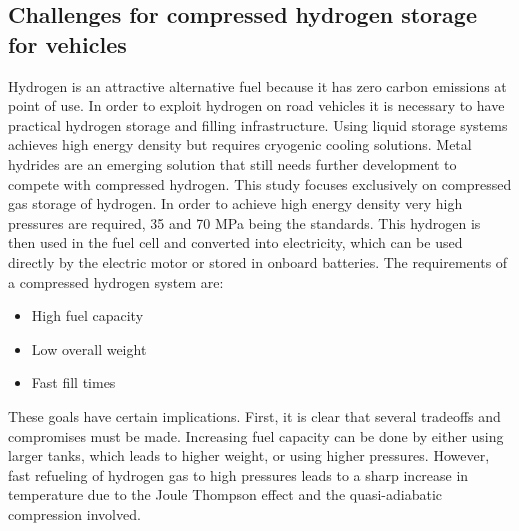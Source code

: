 


\subsection{Challenges for compressed hydrogen storage for vehicles}

\label{sec:challenges}

Hydrogen is an attractive alternative fuel because it has zero carbon emissions at point of use. In order to exploit hydrogen on road vehicles it is necessary to have practical hydrogen storage and filling infrastructure.  Using liquid storage systems achieves high energy density but requires cryogenic cooling solutions. Metal hydrides are an emerging solution that still needs further development to compete with compressed hydrogen. This study focuses exclusively on compressed gas storage of hydrogen. In order to achieve high energy density very high pressures are required, 35 and 70 MPa being the standards. This hydrogen is then used in the fuel cell and converted into electricity, which can be used directly by the electric motor or stored in onboard batteries. The requirements of a compressed hydrogen system are: 


\begin{itemize}
\item High fuel capacity
\item Low overall weight
\item Fast fill times
\end{itemize}

\noindent These goals have certain implications. First, it is clear that several tradeoffs and compromises must be made. Increasing fuel capacity can be done by either using larger tanks, which leads to higher weight, or using higher pressures. However, fast refueling of hydrogen gas to high pressures leads to a sharp increase in temperature due to the Joule Thompson effect and the quasi-adiabatic compression involved.

